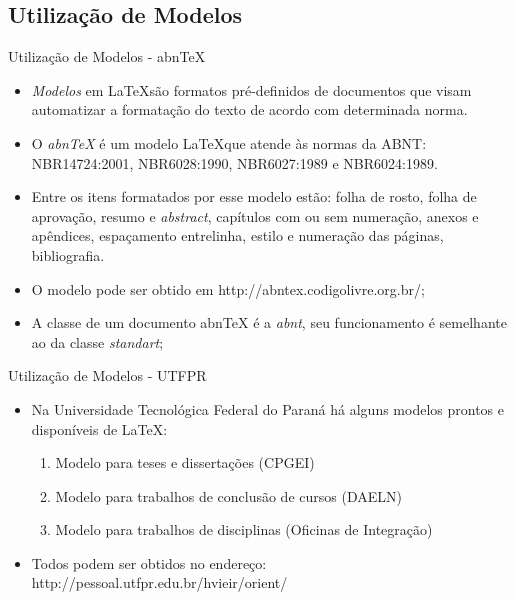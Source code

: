 \subsection{Utilização de Modelos}
\begin{frame}[allowframebreaks]{Utilização de Modelos - abnTeX}

  \begin{itemize}
    \item \textit{Modelos} em \LaTeX são formatos pré-definidos de documentos que visam automatizar a formatação do texto de acordo com determinada norma.
    \item O \textit{abnTeX} é um modelo \LaTeX que atende às normas da ABNT: NBR14724:2001, NBR6028:1990, NBR6027:1989 e NBR6024:1989.
    \item Entre os itens formatados por esse modelo estão: folha de rosto, folha de aprovação, resumo e \textit{abstract}, capítulos com ou sem numeração, anexos e apêndices, espaçamento entrelinha, estilo e numeração das páginas, bibliografia.
    \item O modelo pode ser obtido em http://abntex.codigolivre.org.br/;
    \item A classe de um documento abnTeX é a \textit{abnt}, seu funcionamento é semelhante ao da classe \textit{standart};
  \end{itemize}

\end{frame}

\begin{frame}[allowframebreaks]{Utilização de Modelos - UTFPR}
 
  \begin{itemize}
   \item Na Universidade Tecnológica Federal do Paraná há alguns modelos prontos e disponíveis de \LaTeX:
    
    \begin{enumerate}
      \item Modelo para teses e dissertações (CPGEI) 
      \item Modelo para trabalhos de conclusão de cursos (DAELN) 
      \item Modelo para trabalhos de disciplinas (Oficinas de Integração) 
    \end{enumerate}

    \item Todos podem ser obtidos no endereço: http://pessoal.utfpr.edu.br/hvieir/orient/
      
  \end{itemize}

\end{frame}


